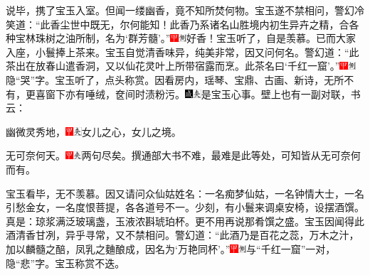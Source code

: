 说毕，携了宝玉入室。但闻一缕幽香，竟不知所焚何物。宝玉遂不禁相问，警幻冷笑道：``此香尘世中既无，尔何能知！此香乃系诸名山胜境内初生异卉之精，合各种宝林珠树之油所制，名为`群芳髓'。''{\includegraphics[width=3mm]{../Images/00002}\includegraphics[width=3mm]{../Images/00011}\footnotesize \kaishu 好香！}宝玉听了，自是羡慕。已而大家入座，小鬟捧上茶来。宝玉自觉清香味异，纯美非常，因又问何名。警幻道：``此茶出在放春山遣香洞，又以仙花灵叶上所带宿露而烹。此茶名曰`千红一窟'。''{\includegraphics[width=3mm]{../Images/00002}\includegraphics[width=3mm]{../Images/00011}\footnotesize \kaishu 隐``哭''字。}宝玉听了，点头称赏。因看房内，瑶琴、宝鼎、古画、新诗，无所不有，更喜窗下亦有唾绒，奁间时渍粉污。{\includegraphics[width=3mm]{../Images/00005}\includegraphics[width=3mm]{../Images/00012}\footnotesize \kaishu 是宝玉心事。}壁上也有一副对联，书云：

幽微灵秀地，{\includegraphics[width=3mm]{../Images/00002}\includegraphics[width=3mm]{../Images/00012}\footnotesize \kaishu 女儿之心，女儿之境。}

无可奈何天。{\includegraphics[width=3mm]{../Images/00002}\includegraphics[width=3mm]{../Images/00012}\footnotesize \kaishu 两句尽矣。撰通部大书不难，最难是此等处，可知皆从无可奈何而有。}

宝玉看毕，无不羡慕。因又请问众仙姑姓名：一名痴梦仙姑，一名钟情大士，一名引愁金女，一名度恨菩提，各各道号不一。少刻，有小鬟来调桌安椅，设摆酒馔。真是：琼浆满泛玻璃盏，玉液浓斟琥珀杯。更不用再说那肴馔之盛。宝玉因闻得此酒清香甘冽，异乎寻常，又不禁相问。警幻道：``此酒乃是百花之蕊，万木之汁，加以麟髓之醅，凤乳之麯酿成，因名为`万艳同杯'。''{\includegraphics[width=3mm]{../Images/00002}\includegraphics[width=3mm]{../Images/00011}\footnotesize \kaishu 与``千红一窟''一对，隐``悲''字。}宝玉称赏不迭。

